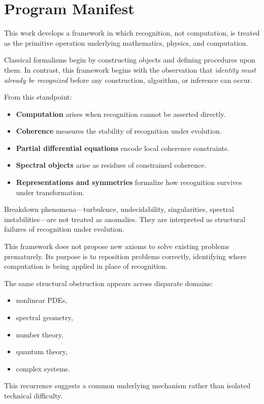\documentclass[12pt, oneside]{article}
\begin{document}
\section{Program Manifest}

This work develops a framework in which recognition, not computation, is treated as the primitive operation underlying mathematics, physics, and computation.

Classical formalisms begin by constructing objects and defining procedures upon them. In contrast, this framework begins with the observation that \emph{identity must already be recognized} before any construction, algorithm, or inference can occur.

From this standpoint:
\begin{itemize}
    \item \textbf{Computation} arises when recognition cannot be asserted directly.
    \item \textbf{Coherence} measures the stability of recognition under evolution.
    \item \textbf{Partial differential equations} encode local coherence constraints.
    \item \textbf{Spectral objects} arise as residues of constrained coherence.
    \item \textbf{Representations and symmetries} formalize how recognition survives under transformation.
\end{itemize}

Breakdown phenomena—turbulence, undecidability, singularities, spectral instabilities—are not treated as anomalies. They are interpreted as structural failures of recognition under evolution.

This framework does not propose new axioms to solve existing problems prematurely. Its purpose is to reposition problems correctly, identifying where computation is being applied in place of recognition.

The same structural obstruction appears across disparate domains:
\begin{itemize}
    \item nonlinear PDEs,
    \item spectral geometry,
    \item number theory,
    \item quantum theory,
    \item complex systems.
\end{itemize}

This recurrence suggests a common underlying mechanism rather than isolated technical difficulty.
\end{document}
